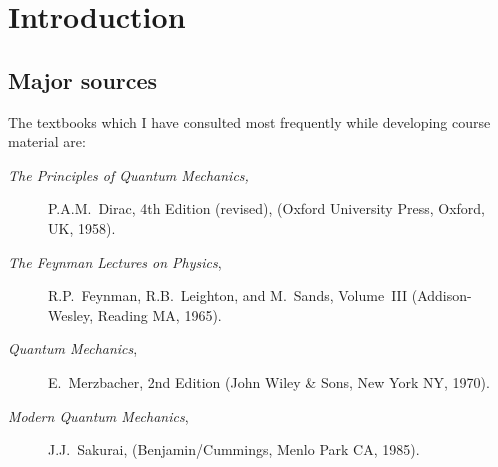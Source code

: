 \chapter{Introduction}
\section{Major sources}
The textbooks which I have consulted most frequently while developing
course material are:
\begin{description}
\item [\em The Principles of Quantum Mechanics,] P.A.M.~Dirac, 4th Edition (revised),
(Oxford University Press, Oxford, UK, 1958).
\item [{\em The Feynman Lectures on Physics},] R.P.~Feynman, R.B.~Leighton,
and M.~Sands, Volume~III (Addison-Wesley, Reading MA, 1965).
\item [{\em Quantum Mechanics},] E.~Merzbacher, 2nd Edition (John Wiley \& Sons,
New York NY, 1970).
\item [{\em Modern Quantum Mechanics},] J.J.~Sakurai, (Benjamin/Cummings, Menlo Park
CA, 1985).
\end{description}

